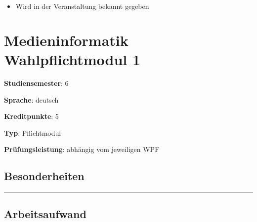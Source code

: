 \begin{itemize}
\tightlist
\item
  Wird in der Veranstaltung bekannt gegeben
\end{itemize}

\hypertarget{medieninformatik-wahlpflichtmodul-1pathlabel....srcmodulbeschreibungen-bachelor-bpo5ba_mi-wpf-1}{%
\chapter{Medieninformatik Wahlpflichtmodul
1\label{../../src/modulbeschreibungen-bachelor-bpo5/BA_MI-WPF-1}}\label{medieninformatik-wahlpflichtmodul-1pathlabel....srcmodulbeschreibungen-bachelor-bpo5ba_mi-wpf-1}}

\begin{modulHead}
\textbf{Studiensemester}:
6
\end{modulHead}
\begin{modulHead}
\textbf{Sprache}:
deutsch
\end{modulHead}
\begin{modulHead}
\textbf{Kreditpunkte}:
5
\end{modulHead}
\begin{modulHead}
\textbf{Typ}:
Pflichtmodul
\end{modulHead}
\begin{modulHead}
\textbf{Prüfungsleistung}:
abhängig vom jeweiligen WPF
\end{modulHead}


\hypertarget{besonderheitenpathlabel....srcmodulbeschreibungen-bachelor-bpo5ba_mi-wpf-1}{%
\section*{Besonderheiten\label{../../src/modulbeschreibungen-bachelor-bpo5/BA_MI-WPF-1}}\label{besonderheitenpathlabel....srcmodulbeschreibungen-bachelor-bpo5ba_mi-wpf-1}}

\begin{center}\rule{0.5\linewidth}{0.5pt}\end{center}

\hypertarget{arbeitsaufwandpathlabel....srcmodulbeschreibungen-bachelor-bpo5ba_mi-wpf-1}{%
\section*{Arbeitsaufwand\label{../../src/modulbeschreibungen-bachelor-bpo5/BA_MI-WPF-1}}\label{arbeitsaufwandpathlabel....srcmodulbeschreibungen-bachelor-bpo5ba_mi-wpf-1}}

